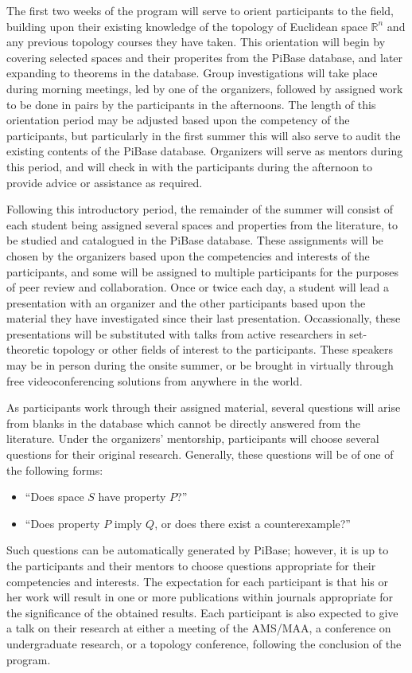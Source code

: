The first two weeks of the program will serve to orient participants
to the field, building upon their existing knowledge of the topology of
Euclidean space \(\mathbb R^n\) and any previous topology courses they
have taken. This orientation will begin by covering selected
spaces and their properites from the PiBase database,
and later expanding to theorems in the database. Group investigations will
take place during morning meetings, led by one of the organizers, followed
by assigned work to be done in pairs by the participants in the afternoons.
The length of this orientation period may be adjusted based upon the
competency of the participants, but particularly in the first summer this
will also serve to audit the existing contents of the PiBase database.
Organizers will serve as mentors during this period, and will check in
with the participants during the afternoon to provide advice or assistance
as required.

Following this introductory period, the remainder of the summer will
consist of each student being assigned several spaces and properties
from the literature,
to be studied and catalogued in the PiBase database. These assignments
will be chosen by the organizers
based upon the competencies and interests of the participants, and some
will be assigned to multiple participants for the purposes of peer review
and collaboration. Once or twice each day,
a student will lead a presentation with an
organizer and the other participants based upon the material they have
investigated since their last presentation. Occassionally, these presentations
will be substituted with talks from active researchers in set-theoretic topology
or other fields of interest to the participants. These speakers may be in
person during the onsite summer, or be brought in virtually through free
videoconferencing solutions from anywhere in the world.

As participants work through their assigned material, several questions will
arise from blanks in the database which cannot be directly
answered from the literature.
Under the organizers' mentorship, participants will choose several questions
for their original research. Generally, these questions will be of one of the
following forms:
\begin{itemize}
  \item ``Does space \(S\) have property \(P\)?''
  \item ``Does property \(P\) imply \(Q\), or does there exist a counterexample?''
\end{itemize}
Such questions can be automatically generated by PiBase; however, it is up
to the participants and their mentors to choose questions appropriate for
their competencies and interests. The expectation for each participant
is that his or her work will result in one or more publications within
journals appropriate for the significance of the obtained results. Each
participant is also expected to give a talk on their research
at either a meeting of the AMS/MAA, a conference on undergraduate research,
or a topology conference, following the conclusion of the program.

